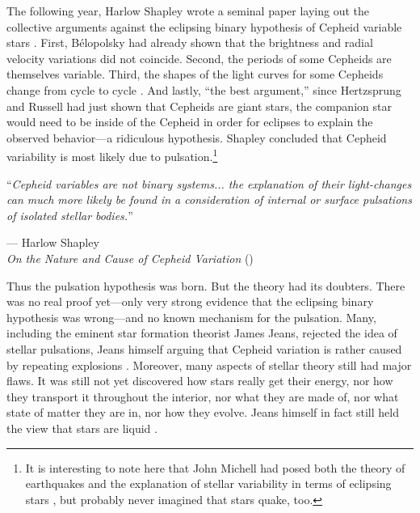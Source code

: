 The following year, Harlow Shapley wrote a seminal paper laying out the collective arguments against the eclipsing binary hypothesis of Cepheid variable stars \citep{1914ApJ....40..448S}. 
First, B{\'e}lopolsky had already shown that the brightness and radial velocity variations did not coincide. 
Second, the periods of some Cepheids are themselves variable. %
Third, the shapes of the light curves for some Cepheids change from cycle to cycle \citep[e.g.,][]{1905ApJ....22..274C}. 
And lastly, ``the best argument,'' since Hertzsprung and Russell had just shown that Cepheids are giant stars, the companion star would need to be inside of the Cepheid in order for eclipses to explain the observed behavior---a ridiculous hypothesis. 
Shapley concluded that Cepheid variability is most likely due to pulsation.\footnote{ It is interesting to note here that John Michell had posed both the theory of earthquakes \citep{Michell01011759} and the explanation of stellar variability in terms of eclipsing stars \citep{michell1767inquiry}, but probably never imagined that stars quake, too.}  

\epigraph{``\emph{Cepheid variables are not binary systems... the explanation of their light-changes \hphantom{``}can much more likely be found in a consideration of internal or surface pulsations \hphantom{``}of isolated stellar bodies.}''}{--- Harlow Shapley\\\textit{On the Nature and Cause of Cepheid Variation} (\citeyear{1914ApJ....40..448S})}

Thus the pulsation hypothesis was born. 
But the theory had its doubters. 
There was no real proof yet---only very strong evidence that the eclipsing binary hypothesis was wrong---and no known mechanism for the pulsation. 
Many, including the eminent star formation theorist James Jeans, rejected the idea of stellar pulsations, Jeans himself arguing that Cepheid variation is rather caused by repeating explosions \citep[e.g.,][]{1919Obs....42...88J}. 
Moreover, many aspects of stellar theory still had major flaws. 
It was still not yet discovered how stars really get their energy, nor how they transport it throughout the interior, nor what they are made of, nor what state of matter they are in, nor how they evolve. 
Jeans himself in fact still held the view that stars are liquid \citep[e.g.,][]{1928Natur.121..173J}. 

